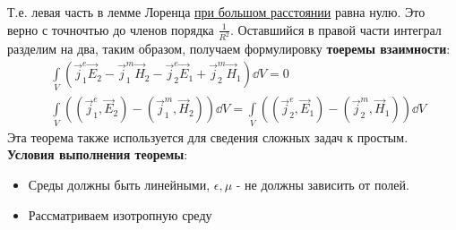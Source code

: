 Т.е. левая часть в лемме Лоренца \underline{при большом расстоянии} равна нулю. Это верно с точночтью до членов порядка
$\frac{1}{R^2}$. Оставшийся в правой части интеграл разделим на два, таким образом, получаем
формулировку \textbf{тоеремы взаимности}:
\begin{align*}
	&\int \limits_V \left( \vec{j}^{e}_1 \vec{E}_2-\vec{j}^{m}_1 \vec{H}_2-\vec{j}^{e}_2 \vec{E}_1+\vec{j}^{m}_2 \vec{H}_1 \right) \dd V = 0\\
	&\int \limits_V \left( (\vec{j}^{e}_1,\vec{E}_2)-(\vec{j}^{m}_1,\vec{H}_2)\right) \dd V = \int \limits_V\left( (\vec{j}^{e}_2,\vec{E}_1)-(\vec{j}^{m}_2,\vec{H}_1) \right) \dd V
\end{align*}
Эта теорема также используется для сведения сложных задач к простым. \textbf{Условия выполнения теоремы}:
\begin{itemize}
	\item Среды должны быть линейными, $\epsilon,\mu$ - не должны зависить от полей.
	\item Рассматриваем изотропную среду
\end{itemize}